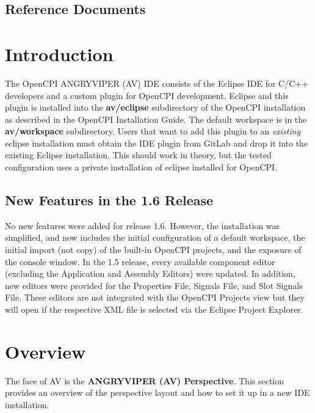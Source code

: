 \documentclass[10pt, a4paper, oneside]{article}
\begin{document}
\subsection{Reference Documents}
\def\myreferences{
\hline
OpenCPI Website &
\href{https://www.opencpi.org}{www.opencpi.org} \\
\hline
OpenCPI Component Development Guide &
\githubio{OpenCPI\_Component\_Development.pdf} \\
\hline
OpenCPI Application Development Guide &
\githubio{OpenCPI\_Application\_Development.pdf} \\
}

\section{Introduction}
The OpenCPI ANGRYVIPER (AV) {IDE} consists of the Eclipse IDE for C/C++ developers and a custom plugin for OpenCPI development. Eclipse and this plugin is installed into the \textbf{av/eclipse} subdirectory of the OpenCPI installation as described in the OpenCPI Installation Guide.  The default workspace is in the \textbf{av/workspace} subdirectory.  Users that want to add this plugin to an \textit{existing} eclipse installation must obtain the IDE plugin from GitLab and drop it into the existing Eclipse installation.  This should work in theory, but the tested configuration uses a private installation of eclipse installed for OpenCPI.
\subsection{New Features in the 1.6 Release}
No new features were added for release 1.6. However, the installation was simplified, and now includes the initial configuration of a default workspace, the initial import (not copy) of the built-in OpenCPI projects, and the exposure of the console window.
In the 1.5 release, every available component editor (excluding the Application and Assembly Editors) were updated. In addition, new editors were provided for the Properties File, Signals File, and Slot Signals File. These editors are not integrated with the OpenCPI Projects view but they will open if the respective XML file is selected via the Eclipse Project Explorer.

\newpage
\section{Overview}
The face of AV is the \textbf{ANGRYVIPER (AV) Perspective}. This section provides an overview of the perspective layout and how to set it up in a new IDE installation.
\end{document}
